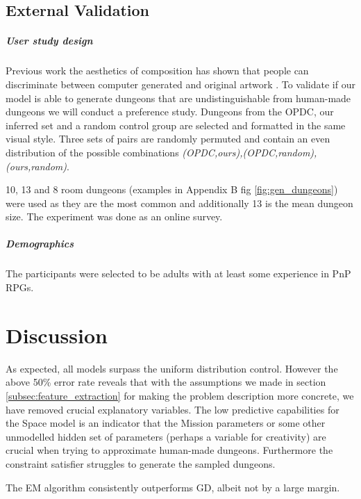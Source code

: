 \documentclass{UoYCSproject}
\begin{document}
\section{External Validation} %
\paragraph{User study design}
Previous work the aesthetics of composition has shown that people can discriminate between computer generated and original artwork \parencite{McManusMondrian} \parencite{FurnhamMondrian}. To validate if our model is able to generate dungeons that are undistinguishable from human-made dungeons we will conduct a preference study. Dungeons from the OPDC, our inferred set and a random control group are selected and formatted in the same visual style. Three sets of pairs are randomly permuted and contain an even distribution of the possible combinations \textit{(OPDC,ours),(OPDC,random),(ours,random)}.

10, 13 and 8 room dungeons (examples in Appendix B fig \ref{fig:gen_dungeons}) were used as they are the most common and additionally 13 is the mean dungeon size.
The experiment was done as an online survey.

\paragraph{Demographics}
The participants were selected to be adults with at least some experience in PnP RPGs. 


\chapter{Discussion}
As expected, all models surpass the uniform distribution control. However the above 50\% error rate reveals that with the assumptions we made in section \ref{subsec:feature_extraction} for making the problem description more concrete, we have removed crucial explanatory variables. The low predictive capabilities for the Space model is an indicator that the Mission parameters or some other unmodelled hidden set of parameters (perhaps a variable for creativity) are crucial when trying to approximate human-made dungeons. Furthermore the constraint satisfier struggles to generate the sampled dungeons.


The EM algorithm consistently outperforms GD, albeit not by a large margin. 
\end{document}
